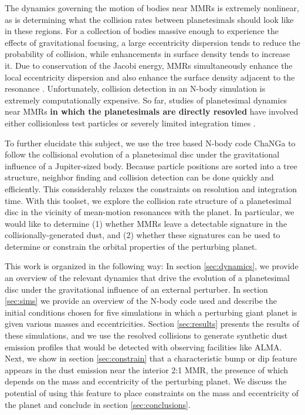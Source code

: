 \documentclass[fleqn,usenatbib]{mnras}
\begin{document}
The dynamics governing the motion of bodies near MMRs is extremely nonlinear, as is determining what the collision rates between planetesimals 
should look like in these regions. For a collection of bodies massive enough to experience the effects of gravitational focusing, a large eccentricity 
dispersion tends to reduce the probability of collision, while enhancements in surface density tends to increase it. Due to conservation of the Jacobi 
energy, MMRs simultaneously enhance the local eccentricity dispersion and also enhance the surface density adjacent to the resonance 
\citep{2000Icar..143...45R, 2017ApJ...850..103B}. Unfortunately, collision detection in an N-body simulation is extremely computationally expensive. 
So far, studies of planetesimal dynamics near MMRs \textbf{in which the planetesimals are directly resovled} have involved either collisionless test particles 
\citep{2017ApJ...850..103B, 2016ApJ...818..159T, 2018ApJ...857....3T} or severely limited integration times \citep{2000Icar..143...45R}.

To further elucidate this subject, we use the tree based N-body code {\sc ChaNGa}\citep{2008IEEEpds...ChaNGa, 2015AphCom..2..1}  to follow the 
collisional evolution of a planetesimal disc under the gravitational influence of a Jupiter-sized body. Because particle positions are sorted into a tree 
structure, neighbor finding and collision detection can be done quickly and efficiently. This considerably relaxes the constraints on resolution and 
integration time. With this toolset, we explore the collision rate structure of a planetesimal disc in the vicinity of mean-motion resonances with the planet. In 
particular, we would like to determine (1) whether MMRs leave a detectable signature in the collisionally-generated dust, and (2) whether these 
signatures can be used to determine or constrain the orbital properties of the perturbing planet.

This work is organized in the following way: In section \ref{sec:dynamics}, we provide an overview of the relevant dynamics that drive the evolution 
of a planetesimal disc under the gravitational influence of an external perturber. In section \ref{sec:sims} we provide an overview of the N-body code 
used and describe the initial conditions chosen for five simulations in which a perturbing giant planet is given various masses 
and eccentricities. Section \ref{sec:results} presents the results of these simulations, and we use the resolved collisions to generate synthetic dust 
emission profiles that would be detected with observing facilities like ALMA. Next, we show in section \ref{sec:constrain} that a characteristic bump 
or dip feature appears in the dust emission near the interior 2:1 MMR, the presence of which depends on the mass and eccentricity of the perturbing 
planet. We discuss the potential of using this feature to place constraints on the mass and eccentricity of the planet and conclude in section 
\ref{sec:conclusions}.
\end{document}
